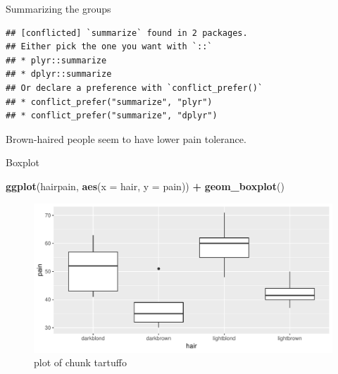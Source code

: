 \documentclass[ignorenonframetext,]{beamer}
\newenvironment{Shaded}{\begin{snugshade}}{\end{snugshade}}
\newcommand{\DataTypeTok}[1]{\textcolor[rgb]{0.13,0.29,0.53}{#1}}
\newcommand{\KeywordTok}[1]{\textcolor[rgb]{0.13,0.29,0.53}{\textbf{#1}}}
\newcommand{\NormalTok}[1]{#1}
\newcommand{\OperatorTok}[1]{\textcolor[rgb]{0.81,0.36,0.00}{\textbf{#1}}}
\newcommand{\StringTok}[1]{\textcolor[rgb]{0.31,0.60,0.02}{#1}}
\begin{document}
\begin{frame}[fragile]{Summarizing the groups}
\protect\hypertarget{summarizing-the-groups}{}

\footnotesize

\begin{Shaded}
\end{Shaded}

\begin{verbatim}
## [conflicted] `summarize` found in 2 packages.
## Either pick the one you want with `::` 
## * plyr::summarize
## * dplyr::summarize
## Or declare a preference with `conflict_prefer()`
## * conflict_prefer("summarize", "plyr")
## * conflict_prefer("summarize", "dplyr")
\end{verbatim}

\normalsize

Brown-haired people seem to have lower pain tolerance.

\end{frame}

\begin{frame}[fragile]{Boxplot}
\protect\hypertarget{boxplot}{}

\begin{Shaded}
\begin{Highlighting}[]
\KeywordTok{ggplot}\NormalTok{(hairpain, }\KeywordTok{aes}\NormalTok{(}\DataTypeTok{x =}\NormalTok{ hair, }\DataTypeTok{y =}\NormalTok{ pain)) }\OperatorTok{+}\StringTok{ }\KeywordTok{geom_boxplot}\NormalTok{()}
\end{Highlighting}
\end{Shaded}

\begin{figure}
\centering
\includegraphics{figure/tartuffo-1.pdf}
\caption{plot of chunk tartuffo}
\end{figure}

\end{frame}
\end{document}
